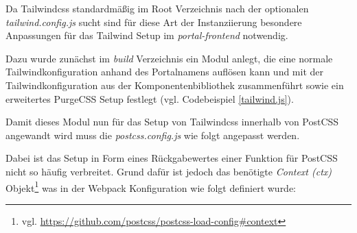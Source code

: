 Da Tailwindcss standardmäßig im Root Verzeichnis nach der optionalen \textit{tailwind.config.js} sucht sind für diese Art der Instanziierung besondere Anpassungen für das Tailwind Setup im \textit{portal-frontend} notwendig.

Dazu wurde zunächst im \textit{build} Verzeichnis ein Modul anlegt, die eine normale Tailwindkonfiguration anhand des Portalnamens auflösen kann und mit der Tailwindkonfiguration aus der Komponentenbibliothek zusammenführt sowie ein erweitertes PurgeCSS Setup festlegt (vgl. Codebeispiel \ref{tailwind.js}).



Damit dieses Modul nun für das Setup von Tailwindcss innerhalb von PostCSS angewandt wird muss die \textit{postcss.config.js} wie folgt angepasst werden.



Dabei ist das Setup in Form eines Rückgabewertes einer Funktion für PostCSS nicht so häufig verbreitet. Grund dafür ist jedoch das benötigte \textit{Context (ctx)} Objekt\footnote{vgl. \url{https://github.com/postcss/postcss-load-config\#context}} was in der Webpack Konfiguration wie folgt definiert wurde:

